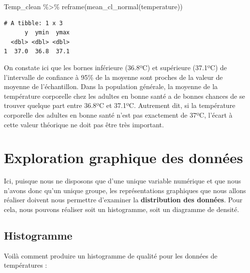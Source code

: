 \documentclass[
  a4paper,
  DIV=11,
  numbers=noendperiod,
  oneside]{scrreprt}
\newenvironment{Shaded}{}{}
\newcommand{\FunctionTok}[1]{\textcolor[rgb]{0.44,0.26,0.76}{#1}}
\newcommand{\NormalTok}[1]{\textcolor[rgb]{0.14,0.16,0.18}{#1}}
\newcommand{\SpecialCharTok}[1]{\textcolor[rgb]{0.00,0.36,0.77}{#1}}
\begin{document}
\begin{Shaded}
\begin{Highlighting}[]
\NormalTok{Temp\_clean }\SpecialCharTok{\%\textgreater{}\%} 
  \FunctionTok{reframe}\NormalTok{(}\FunctionTok{mean\_cl\_normal}\NormalTok{(temperature))}
\end{Highlighting}
\end{Shaded}

\begin{verbatim}
# A tibble: 1 x 3
      y  ymin  ymax
  <dbl> <dbl> <dbl>
1  37.0  36.8  37.1
\end{verbatim}

On constate ici que les bornes inférieure (36.8ºC) et supérieure
(37.1ºC) de l'intervalle de confiance à 95\% de la moyenne sont proches
de la valeur de moyenne de l'échantillon. Dans la population générale,
la moyenne de la température corporelle chez les adultes en bonne santé
a de bonnes chances de se trouver quelque part entre 36.8ºC et 37.1ºC.
Autrement dit, si la température corporelle des adultes en bonne santé
n'est pas exactement de 37ºC, l'écart à cette valeur théorique ne doit
pas être très important.

\hypertarget{sec-edagraph}{%
\section{Exploration graphique des données}\label{sec-edagraph}}

Ici, puisque nous ne disposons que d'une unique variable numérique et
que nous n'avons donc qu'un unique groupe, les représentations
graphiques que nous allons réaliser doivent nous permettre d'examiner la
\textbf{distribution des données}. Pour cela, nous pouvons réaliser soit
un histogramme, soit un diagramme de densité.

\hypertarget{histogramme}{%
\subsection{Histogramme}\label{histogramme}}

Voilà comment produire un histogramme de qualité pour les données de
températures :
\end{document}
